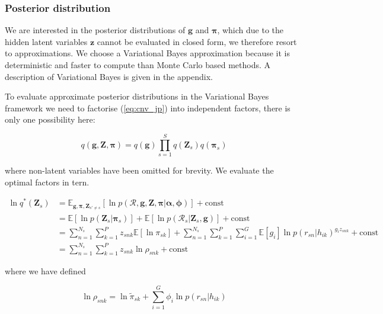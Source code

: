 \documentclass{article}
\begin{document}
\subsubsection{Posterior distribution}

We are interested in the posterior distributions of $\boldsymbol{g}$ and $\boldsymbol{\pi}$, which due to the hidden latent variables $\boldsymbol{z}$ cannot be evaluated in closed form, we therefore resort to approximations. We choose a Variational Bayes approximation because it is deterministic and faster to compute than Monte Carlo based methods. A description of Variational Bayes is given in the appendix.

To evaluate approximate posterior distributions in the Variational Bayes framework we need to factorise (\ref{eq:cnv_jp}) into independent factors, there is only one possibility here:

\begin{equation}
\label{eq:cnv_vb_factors}
    q(\boldsymbol{g}, \boldsymbol{Z}, \boldsymbol{\pi}) = q(\boldsymbol{g}) \prod_{s = 1}^S q(\boldsymbol{Z}_s) q(\boldsymbol{\pi}_s)
\end{equation}

where non-latent variables have been omitted for brevity. We evaluate the optimal factors in tern.

\begin{align}
\label{eq:cnv_ln_q_z}
\ln q^*(\boldsymbol{Z}_s) &= \mathbb{E}_{\boldsymbol{g}, \boldsymbol{\pi}, \boldsymbol{Z}_{s' \ne s}} [\ln p(\mathcal{R}, \boldsymbol{g}, \boldsymbol{Z}, \boldsymbol{\pi} | \boldsymbol{\alpha}, \boldsymbol{\phi})] + \text{const} \\
&= \mathbb{E}[\ln p(\boldsymbol{Z}_s | \boldsymbol{\pi}_s)] + \mathbb{E}[\ln p(\mathcal{R}_s | \boldsymbol{Z}_s, \boldsymbol{g})] + \text{const} \\
&= \sum_{n = 1}^{N_s} \sum_{k = 1}^P z_{snk} \mathbb{E}[\ln \pi_{sk}] + \sum_{n = 1}^{N_s} \sum_{k = 1}^P \sum_{i = 1}^G \mathbb{E}[g_i] \ln p(r_{sn} | h_{ik})^{g_i z_{snk}} + \text{const} \\
&= \sum_{n = 1}^{N_s} \sum_{k = 1}^P z_{snk} \ln \rho_{snk} + \text{const}
\end{align}

where we have defined

\begin{equation}
\label{eq:cnv_ln_rho}
\ln \rho_{snk} = \ln \tilde{\pi}_{sk} + \sum_{i = 1}^G \phi_i \ln p(r_{sn} | h_{ik})
\end{equation}
\end{document}
